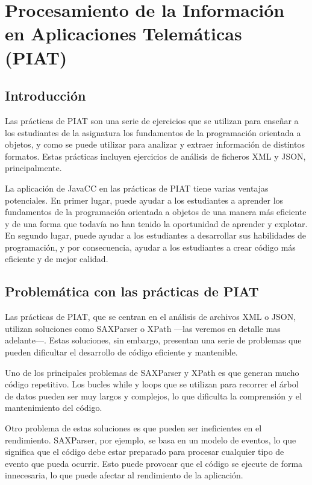 \section{Procesamiento de la Información en Aplicaciones Telemáticas (PIAT)}
\subsection{Introducción}
\noindent Las prácticas de PIAT son una serie de ejercicios que se utilizan para enseñar a los estudiantes de la asignatura los fundamentos de la programación orientada a objetos, y como se puede utilizar para analizar y extraer información de distintos formatos. Estas prácticas incluyen ejercicios de análisis de ficheros XML y JSON, principalmente.

La aplicación de JavaCC en las prácticas de PIAT tiene varias ventajas potenciales. En primer lugar, puede ayudar a los estudiantes a aprender los fundamentos de la programación orientada a objetos de una manera más eficiente y de una forma que todavía no han tenido la oportunidad de aprender y explotar. En segundo lugar, puede ayudar a los estudiantes a desarrollar sus habilidades de programación, y por consecuencia, ayudar a los estudiantes a crear código más eficiente y de mejor calidad.
\subsection{Problemática con las prácticas de PIAT}

\noindent Las prácticas de PIAT, que se centran en el análisis de archivos XML o JSON,  utilizan soluciones como SAXParser o XPath ---las veremos en detalle mas adelante---. Estas soluciones, sin embargo, presentan una serie de problemas que pueden dificultar el desarrollo de código eficiente y mantenible.

Uno de los principales problemas de SAXParser y XPath es que generan mucho código repetitivo. Los bucles while y loops que se utilizan para recorrer el árbol de datos pueden ser muy largos y complejos, lo que dificulta la comprensión y el mantenimiento del código.

Otro problema de estas soluciones es que pueden ser ineficientes en el rendimiento. SAXParser, por ejemplo, se basa en un modelo de eventos, lo que significa que el código debe estar preparado para procesar cualquier tipo de evento que pueda ocurrir. Esto puede provocar que el código se ejecute de forma innecesaria, lo que puede afectar al rendimiento de la aplicación.

